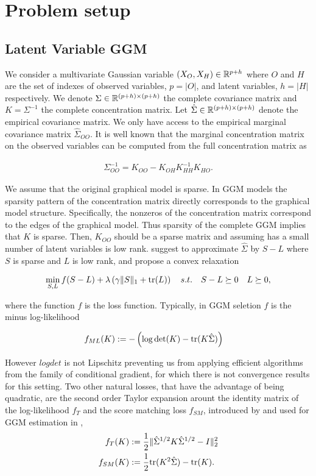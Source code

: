 \section{Problem setup}
\label{setup}

\subsection{Latent Variable GGM}
\label{sec:ggm}
We consider a multivariate Gaussian variable $(X_{O},X_{H})\in\mathbb{R}^{p+h}$ where $O$ and $H$ are the set of indexes of observed variables, $p=|O|$, and latent variables, $h=|H|$ respectively. We denote $\Sigma\in\mathbb{R}^{(p+h)\times(p+h)}$ the complete covariance matrix and $K=\Sigma^{-1}$ the complete concentration matrix. Let $\hat{\Sigma}\in\mathbb{R}^{(p+h)\times(p+h)}$ denote the empirical covariance matrix. We only have access to the empirical marginal covariance matrix $\hat{\Sigma}_{OO}$. It is well known that the marginal concentration matrix on the observed variables can be computed from the full concentration matrix as

\begin{align}
\Sigma_{OO}^{-1} = K_{OO}-K_{OH}K_{HH}^{-1}K_{HO}.
\end{align}

We assume that the original graphical model is sparse. In GGM models the sparsity pattern of the concentration matrix  directly corresponds to the graphical model structure. Specifically, the nonzeros of the concentration matrix correspond to the edges of the graphical model. Thus sparsity of the complete GGM implies that $K$ is sparse. Then, $K_{OO}$ should be a sparse matrix and assuming has a small number of latent variables is low rank. \citet{chandrasekaran2010} suggest to approximate $\hat{\Sigma}$  by $S-L$ where $S$ is sparse and $L$ is low rank, and propose a convex relaxation

\begin{align}
\label{opt_tr}
\min_{S,L} f(S-L)+\lambda\left(\gamma\|S\|_{1}+ {\rm tr}(L)\right) \quad s.t. \quad S-L \succeq 0 \quad L \succeq 0,
\end{align}

where the function $f$ is the loss function. Typically, in GGM seletion $f$ is the minus log-likelihood

\begin{align}
f_{ML}(K)&:=-\left(\log\det(K) - {\rm tr}(K\hat{\Sigma})\right)
\end{align}

However $\textit{logdet}$ is not Lipschitz preventing us from applying efficient algorithms from the family of conditional gradient, for which there is not convergence results for this setting.  Two other natural losses, that have the advantage of being quadratic, are the second order Taylor expansion arount the identity matrix of the log-likelihood $f_{T}$ and the score matching loss $f_{SM}$, introduced by \citet{hyvarinen2005estimation} and used for GGM estimation in \citet{lin2016estimation},
\begin{align}
f_{T}(K)&:=\frac{1}{2}\|\hat{\Sigma}^{1/2}K\hat{\Sigma}^{1/2}-I\|_2^2\\
f_{SM}(K)&:=\frac{1}{2}{\rm tr}(K^2 \hat{\Sigma})-{\rm tr}(K).
\end{align}


